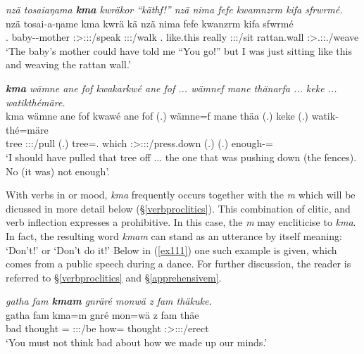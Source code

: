 \begin{exe}
	\ex \emph{nzä tosaiaŋama \textbf{kma} kwräkor ``käthf!'' nzä nima fefe kwamnzrm kifa sfrwrmé.}\\
	\gll nzä tosai-a-ŋame kma kwrä kä nzä nima fefe kwanzrm kifa sfwrmé\\
	\Fsg{}.\Abs{} baby-\Poss-mother \Pot{} \Stsg:\Sbj>\Fsg:\Obj:\Irr:\Pfv/speak \Ssg:\Sbj:\Imp:\Pfv/walk \Fsg{}.\Abs{} {like.this} really \Fsg:\Sbj:\Pst:\Dur/sit rattan.wall \Fsg:\Sbj>\Tsg.\Masc:\Obj:\Pst.\Dur/weave\\
	\trans `The baby's mother could have told me ``You go!'' but I was just sitting like this and weaving the rattan wall.' 
	\label{ex109}
\end{exe}
\begin{exe}
	\ex \emph{\textbf{kma} wämne ane fof kwakarkwé ane fof ... wämnef mane thänarfa ... keke ... watikthémäre.}\\
	\gll kma wämne ane fof kwawé ane fof (.) wämne=f mane thäa (.) keke (.) watik-thé=märe\\
	\Pot{} tree \Dem{} \Emph{} \Fsg:\Sbj:\Rpst:\Ipfv/pull \Dem{} \Emph{} (.) tree=\Erg.\Sg{} which \Stsg:\Sbj>\Stpl:\Obj:\Pst:\Pfv/press.down (.) \Neg{} (.) enough-\Adlzr=\Priv{}\\
	\trans `I should have pulled that tree off ... the one that was pushing down (the fences). No (it was) not enough'. 
	\label{ex110}
\end{exe}

With verbs in  or  mood, \emph{kma} frequently occurs together with the  \emph{m} which will be dicussed in more detail below (\S{}\ref{verbproclitics}). This combination of clitic,  and verb inflection expresses a prohibitive. In this case, the  \emph{m} may encliticise to \emph{kma}. In fact, the resulting word \emph{kmam} can stand as an utterance by itself meaning: `Don't!' or `Don't do it!' Below in (\ref{ex111}) one such example is given, which comes from a public speech during a dance. For further discussion, the reader is referred to \S{}\ref{verbproclitics} and \S{}\ref{apprehensivem}.

\begin{exe}
	\ex \emph{gatha fam \textbf{kmam} gnräré monwä z fam thäkuke.}\\
	\gll gatha fam kma=m gnré mon=wä z fam thäe\\
	bad thought \Pot{}=\Appr{} \Ssg:\Sbj:\Imp:\Ipfv/be how=\Emph{} \Iam{} thought \Fpl:\Sbj>\Stpl:\Obj:\Rpst:\Pfv/erect\\
	\trans `You must not think bad about how we made up our minds.' 
	\label{ex111}
\end{exe}

